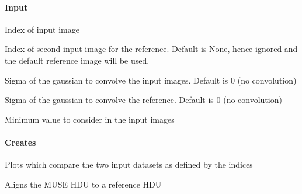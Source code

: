 \documentclass[letterpaper,10pt,english]{sphinxmanual}
\begin{document}
\begin{fulllineitems}
\begin{fulllineitems}
\label{\detokenize{api/pymusepipe:pymusepipe.align_pipe.AlignMuseDataset.compare_ima}}
\pysigstartsignatures
{}
\pysigstopsignatures

\paragraph{Input}
\label{\detokenize{api/pymusepipe:id2}}\begin{description}
\sphinxAtStartPar
Index of input image

\sphinxAtStartPar
Index of second input image for the reference. Default is None, hence ignored
and the default reference image will be used.

\sphinxAtStartPar
Sigma of the gaussian to convolve the input images. Default is 0 (no convolution)

\sphinxAtStartPar
Sigma of the gaussian to convolve the reference. Default is 0 (no convolution)

\sphinxAtStartPar
Minimum value to consider in the input images

\end{description}


\paragraph{Creates}
\label{\detokenize{api/pymusepipe:creates}}
\sphinxAtStartPar
Plots which compare the two input datasets as defined by the indices

\end{fulllineitems}


\begin{fulllineitems}
\label{\detokenize{api/pymusepipe:pymusepipe.align_pipe.AlignMuseDataset.find_cross_peak}}
\pysigstartsignatures
{}
\pysigstopsignatures
\sphinxAtStartPar
Aligns the MUSE HDU to a reference HDU



\end{fulllineitems}
\end{fulllineitems}
\end{document}
